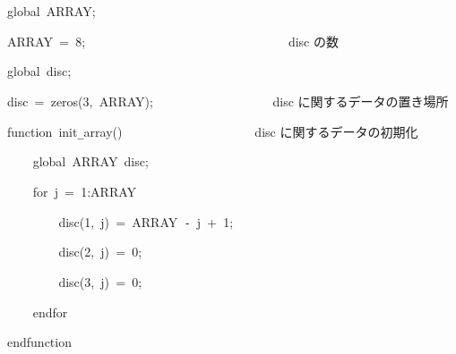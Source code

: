 \documentclass[a4paper,10pt]{article}
\def\mc{\relax}
\begin{document}
\noindent
\mbox{}global{\tt\mc \ }ARRAY;

\noindent
\mbox{}ARRAY{\tt\mc \ }={\tt\mc \ }8;{\tt\mc \ }{\tt\mc \ }{\tt\mc \ }{\tt\mc \ }{\tt\mc \ }{\tt\mc \ }{\tt\mc \ }{\tt\mc \ }{\tt\mc \ }{\tt\mc \ }{\tt\mc \ }{\tt\mc \ }{\tt\mc \ }{\tt\mc \ }{\tt\mc \ }{\tt\mc \ }{\tt\mc \ }{\tt\mc \ }{\tt\mc \ }{\tt\mc \ }{\tt\mc \ }{\tt\mc \ }{\tt\mc \ }{\tt\mc \ }{\tt\mc \ }{\tt\mc \ }{\tt\mc \ }{\tt\mc \ }{\tt\mc \ }{\tt\mc \ }\rm\mc {\tt\%} \ disc の数 \hfill
\tt\mc 

\noindent
\mbox{}\hfill

\noindent
\mbox{}global{\tt\mc \ }disc;

\noindent
\mbox{}disc{\tt\mc \ }={\tt\mc \ }zeros(3,{\tt\mc \ }ARRAY);{\tt\mc \ }{\tt\mc \ }{\tt\mc \ }{\tt\mc \ }{\tt\mc \ }{\tt\mc \ }{\tt\mc \ }{\tt\mc \ }{\tt\mc \ }{\tt\mc \ }{\tt\mc \ }{\tt\mc \ }{\tt\mc \ }{\tt\mc \ }{\tt\mc \ }{\tt\mc \ }{\tt\mc \ }\rm\mc {\tt\%} \ disc に関するデータの置き場所\hfill
\tt\mc 

\noindent
\mbox{}\hfill

\noindent
\mbox{}function{\tt\mc \ }init{\tt\_}array(){\tt\mc \ }{\tt\mc \ }{\tt\mc \ }{\tt\mc \ }{\tt\mc \ }{\tt\mc \ }{\tt\mc \ }{\tt\mc \ }{\tt\mc \ }{\tt\mc \ }{\tt\mc \ }{\tt\mc \ }{\tt\mc \ }{\tt\mc \ }{\tt\mc \ }{\tt\mc \ }{\tt\mc \ }{\tt\mc \ }{\tt\mc \ }\rm\mc {\tt\%} \ disc に関するデータの初期化\hfill
\tt\mc 

\noindent
\mbox{}{\tt\mc \ }{\tt\mc \ }{\tt\mc \ }{\tt\mc \ }global{\tt\mc \ }ARRAY{\tt\mc \ }disc;

\noindent
\mbox{}{\tt\mc \ }{\tt\mc \ }{\tt\mc \ }{\tt\mc \ }for{\tt\mc \ }j{\tt\mc \ }={\tt\mc \ }1:ARRAY

\noindent
\mbox{}{\tt\mc \ }{\tt\mc \ }{\tt\mc \ }{\tt\mc \ }{\tt\mc \ }{\tt\mc \ }{\tt\mc \ }{\tt\mc \ }disc(1,{\tt\mc \ }j){\tt\mc \ }={\tt\mc \ }ARRAY{\tt\mc \ }{\tt -}{\tt\mc \ }j{\tt\mc \ }+{\tt\mc \ }1;

\noindent
\mbox{}{\tt\mc \ }{\tt\mc \ }{\tt\mc \ }{\tt\mc \ }{\tt\mc \ }{\tt\mc \ }{\tt\mc \ }{\tt\mc \ }disc(2,{\tt\mc \ }j){\tt\mc \ }={\tt\mc \ }0;

\noindent
\mbox{}{\tt\mc \ }{\tt\mc \ }{\tt\mc \ }{\tt\mc \ }{\tt\mc \ }{\tt\mc \ }{\tt\mc \ }{\tt\mc \ }disc(3,{\tt\mc \ }j){\tt\mc \ }={\tt\mc \ }0;

\noindent
\mbox{}{\tt\mc \ }{\tt\mc \ }{\tt\mc \ }{\tt\mc \ }endfor

\noindent
\mbox{}endfunction

\noindent
\mbox{}\hfill
\end{document}
